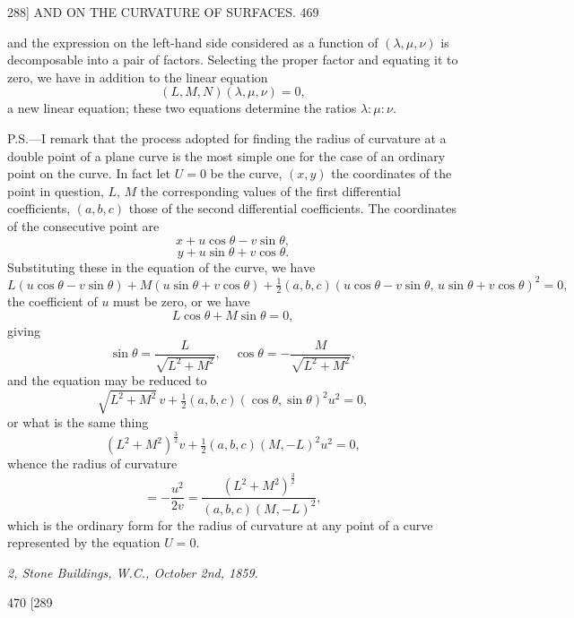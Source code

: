 \documentclass[11pt]{article}
\begin{document}
\begin{center}
\textsc{288]} \hfill AND ON THE CURVATURE OF SURFACES. \hfill 469
\end{center}

and the expression on the left-hand side considered as a function of $(\lambda,\mu,\nu)$ is
decomposable into a pair of factors. Selecting the proper factor and equating it to
zero, we have in addition to the linear equation
\[ (L,M,N)(\lambda,\mu,\nu)=0, \]
a new linear equation; these two equations determine the ratios $\lambda:\mu:\nu$.

\smallskip

P.S.---I remark that the process adopted for finding the radius of curvature at a
double point of a plane curve is the most simple one for the case of an ordinary
point on the curve. In fact let $U=0$ be the curve, $(x,y)$ the coordinates of the
point in question, $L$, $M$ the corresponding values of the first differential coefficients,
$(a,b,c)$ those of the second differential coefficients. The coordinates of the consecutive
point are
\[ x+u\cos\theta-v\sin\theta, \]
\[ y+u\sin\theta+v\cos\theta. \]
Substituting these in the equation of the curve, we have
\[ L(u\cos\theta-v\sin\theta)+M(u\sin\theta+v\cos\theta)+\tfrac{1}{2}(a,b,c)(u\cos\theta-v\sin\theta,\, u\sin\theta+v\cos\theta)^{2}=0, \]
the coefficient of $u$ must be zero, or we have
\[ L\cos\theta+M\sin\theta=0, \]
giving
\[ \sin\theta=\frac{L}{\sqrt{L^{2}+M^{2}}},\quad \cos\theta=-\frac{M}{\sqrt{L^{2}+M^{2}}}, \]
and the equation may be reduced to
\[ \sqrt{L^{2}+M^{2}}\, v+\tfrac{1}{2}(a,b,c)(\cos\theta,\sin\theta)^{2}u^{2}=0, \]
or what is the same thing
\[ (L^{2}+M^{2})^{\tfrac{3}{2}}v+\tfrac{1}{2}(a,b,c)(M,-L)^{2}u^{2}=0, \]
whence the radius of curvature
\[ =-\frac{u^{2}}{2v}=\frac{(L^{2}+M^{2})^{\tfrac{3}{2}}}{(a,b,c)(M,-L)^{2}}, \]
which is the ordinary form for the radius of curvature at any point of a curve
represented by the equation $U=0$.

\smallskip

\hfill\textit{2, Stone Buildings, W.C., October 2nd, 1859.}

\vfill

\newpage
\begin{center}
470 \hfill \textsc{[289}
\end{center}
\end{document}
